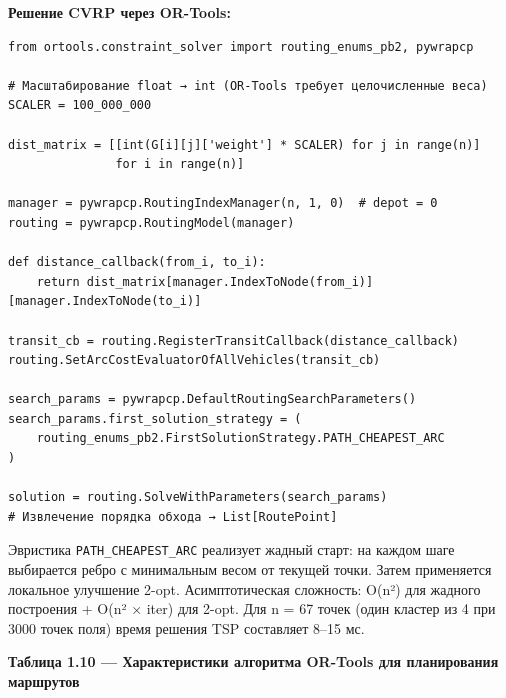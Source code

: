 \textbf{Решение CVRP через OR-Tools:}

\begin{verbatim}
from ortools.constraint_solver import routing_enums_pb2, pywrapcp

# Масштабирование float → int (OR-Tools требует целочисленные веса)
SCALER = 100_000_000

dist_matrix = [[int(G[i][j]['weight'] * SCALER) for j in range(n)]
               for i in range(n)]

manager = pywrapcp.RoutingIndexManager(n, 1, 0)  # depot = 0
routing = pywrapcp.RoutingModel(manager)

def distance_callback(from_i, to_i):
    return dist_matrix[manager.IndexToNode(from_i)][manager.IndexToNode(to_i)]

transit_cb = routing.RegisterTransitCallback(distance_callback)
routing.SetArcCostEvaluatorOfAllVehicles(transit_cb)

search_params = pywrapcp.DefaultRoutingSearchParameters()
search_params.first_solution_strategy = (
    routing_enums_pb2.FirstSolutionStrategy.PATH_CHEAPEST_ARC
)

solution = routing.SolveWithParameters(search_params)
# Извлечение порядка обхода → List[RoutePoint]
\end{verbatim}

Эвристика \texttt{PATH\_CHEAPEST\_ARC} реализует жадный старт: на каждом шаге выбирается ребро с минимальным весом от текущей точки. Затем применяется локальное улучшение 2-opt. Асимптотическая сложность: O(n²) для жадного построения + O(n² × iter) для 2-opt. Для n = 67 точек (один кластер из 4 при 3000 точек поля) время решения TSP составляет 8--15 мс.

\textbf{Таблица 1.10 --- Характеристики алгоритма OR-Tools для планирования маршрутов}

